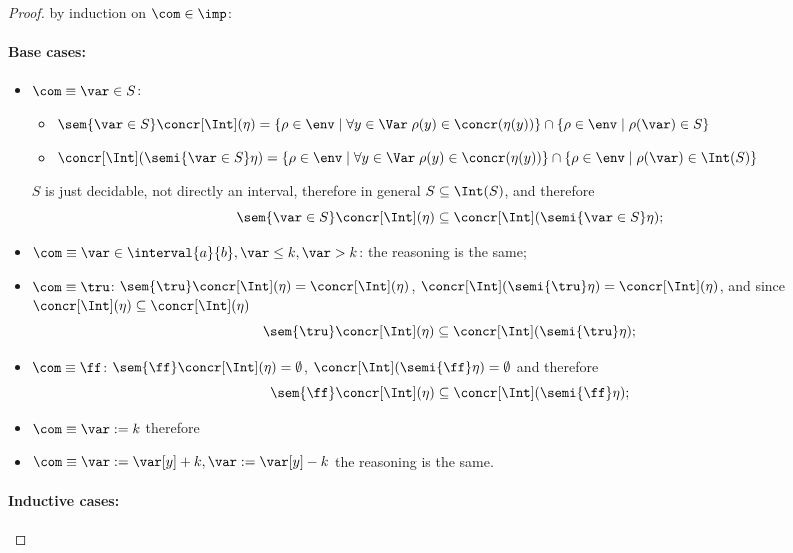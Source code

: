 \begin{proof}
  by induction on \(\com\in\imp\):
  
  \noindent
  \paragraph*{Base cases:\\}
  \begin{itemize}
  \item \(\com \equiv \var \in S\):
    \begin{itemize}
    \item \(\sem{\var\in S}\concr[\Int](\eta) = \{\rho \in \env \mid
      \forall y \in \Var \; \rho(y) \in \concr(\eta(y))\} \cap \{\rho
      \in \env \mid \rho(\var) \in S\}\)
    \item \(\concr[\Int](\semi{\var\in S}\eta) = \{\rho \in \env \mid
      \forall y \in \Var \; \rho(y) \in \concr(\eta(y))\} \cap \{\rho
      \in \env \mid \rho(\var) \in \Int(S)\}\)
    \end{itemize}
    \(S\) is just decidable, not directly an interval, therefore in
    general \(S \subseteq \Int(S)\), and therefore \[\sem{\var \in
      S}\concr[\Int](\eta) \subseteq \concr[\Int](\semi{\var\in
      S}\eta);\]
  \item \(\com \equiv \var \in \interval{a}{b}, \var \leq k, \var >
    k\): the reasoning is the same;
  \item \(\com \equiv \tru\): \(\sem{\tru}\concr[\Int](\eta) =
    \concr[\Int](\eta)\), \(\concr[\Int](\semi{\tru}\eta) =
    \concr[\Int](\eta)\), and since \(\concr[\Int](\eta) \subseteq
    \concr[\Int](\eta)\) \[\sem{\tru}\concr[\Int](\eta) \subseteq
    \concr[\Int](\semi{\tru}\eta);\]
  \item \(\com \equiv \ff\): \(\sem{\ff}\concr[\Int](\eta) =
    \emptyset\), \(\concr[\Int](\semi{\ff}\eta) = \emptyset\) and
    therefore \[\sem{\ff}\concr[\Int](\eta) \subseteq
    \concr[\Int](\semi{\ff}\eta);\]
  \item \(\com \equiv \var := k\) therefore \(\)
  \item \(\com \equiv \var := \var[y] + k, \var := \var[y] - k\) the
    reasoning is the same.
  \end{itemize}  
  \noindent
  \paragraph*{Inductive cases:\\}
\end{proof}

